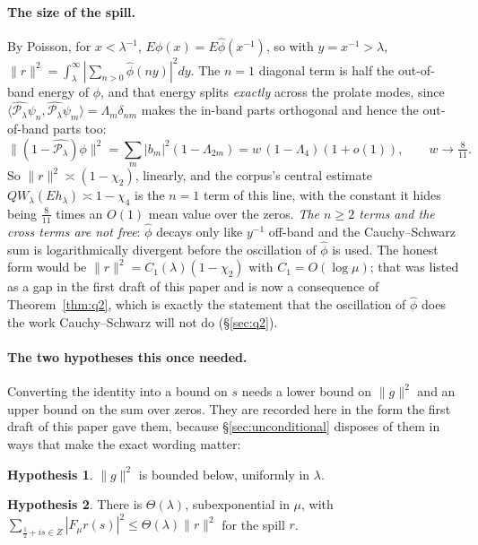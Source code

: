 \documentclass[11pt,a4paper]{article}
\theoremstyle{plain}
\theoremstyle{definition}
\newtheorem{hypothesis}{Hypothesis}
\theoremstyle{remark}
\newcommand{\R}{\mathbb{R}}
\newcommand{\Z}{\mathbb{Z}}
\newcommand{\Q}{\mathbb{Q}}
\newcommand{\A}{\mathbb{A}}
\newcommand{\E}{\mathcal{E}}
\newcommand{\F}{\mathcal{F}}
\newcommand{\QW}{QW}
\def\QW{QW}\def\E{E}\def\F{F}\def\R{R}\def\Q{Q}\def\Z{Z}\def\A{A}%
\begin{document}
\paragraph{The size of the spill.}  By Poisson, for $x<\lambda^{-1}$,
$\E\phi(x)=\E\widehat\phi(x^{-1})$, so with $y=x^{-1}>\lambda$,
$\|r\|^2=\int_\lambda^\infty|\sum_{n>0}\widehat\phi(ny)|^2dy$.  The $n=1$
diagonal term is half the out-of-band energy of $\phi$, and that energy splits
\emph{exactly} across the prolate modes, since
$\langle\widehat{\mathcal P_\lambda}\psi_n,\widehat{\mathcal P_\lambda}\psi_m\rangle=\Lambda_m\delta_{nm}$
makes the in-band parts orthogonal and hence the out-of-band parts too:
\[
  \big\|(1-\widehat{\mathcal P_\lambda})\phi\big\|^2
  =\sum_m|b_m|^2(1-\Lambda_{2m})=w\,(1-\Lambda_4)(1+o(1)),\qquad w\to\tfrac8{11}.
\]
So $\|r\|^2\asymp(1-\chi_2)$, linearly, and the corpus's central estimate
$\QW_\lambda(\E h_\lambda)\asymp1-\chi_4$ is the $n=1$ term of this line, with
the constant it hides being $\tfrac8{11}$ times an $O(1)$ mean value over the
zeros.  \emph{The $n\ge2$ terms and the cross terms are not free}: $\widehat\phi$
decays only like $y^{-1}$ off-band and the Cauchy--Schwarz sum is
logarithmically divergent before the oscillation of $\widehat\phi$ is used.  The
honest form would be $\|r\|^2=C_1(\lambda)(1-\chi_2)$ with $C_1=O(\log\mu)$;
that was listed as a gap in the first draft of this paper and is now a
consequence of Theorem~\ref{thm:q2}, which is exactly the statement that the
oscillation of $\widehat\phi$ does the work Cauchy--Schwarz will not do
(\S\ref{sec:q2}).

\paragraph{The two hypotheses this once needed.}  Converting the identity into a
bound on $s$ needs a lower bound on $\|g\|^2$ and an upper bound on the sum over
zeros.  They are recorded here in the form the first draft of this paper gave
them, because \S\ref{sec:unconditional} disposes of them in ways that make the
exact wording matter:

\setcounter{hypothesis}{-1}
\begin{hypothesis}\label{H0}
$\|g\|^2$ is bounded below, uniformly in $\lambda$.
\end{hypothesis}

\begin{hypothesis}\label{H1}
There is $\Theta(\lambda)$, subexponential in $\mu$, with
$\sum_{\frac12+is\in Z}|\F_\mu r(s)|^2\le\Theta(\lambda)\|r\|^2$ for the spill
$r$.
\end{hypothesis}
\end{document}
